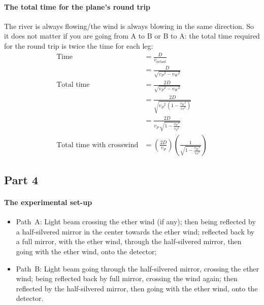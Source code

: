 \documentclass[pagesize,headsepline,10pt,parskip=half]{scrreprt}
\begin{document}
        \paragraph{The total time for the plane’s round trip}
          The river is always flowing/the wind is always blowing
          in the same direction.  So it does not matter if you are
          going from A to B or B to A: the total time required
          for the round trip is twice the time for each leg:
          \begin{align*}
            \text{Time} &= \frac{D}{v_{actual}}\\
            &= \frac{D}{\sqrt{{v_P}^2 - {v_W}^2}}\\
            \text{Total time} &= \frac{2D}{\sqrt{{v_P}^2 - {v_W}^2}}\\
            &= \frac{2D}{\sqrt{{v_P}^2\,\left(1 - \frac{{v_W}^2}{{v_P}^2}\right)}}\\
            &= \frac{2D}{v_P\,\sqrt{1 - \frac{{v_W}^2}{{v_P}^2}}}\\
            \text{Total time with crosswind} &= \left(\frac{2D}{v_P}\right)\left(\frac{1}{\sqrt{1 - \frac{{v_W}^2}{{v_P}^2}}}\right)
          \end{align*}

      \clearpage
      \subsection{Part 4}
        \paragraph{The experimental set-up}
          \begin{itemize}
            \item Path~A: Light beam crossing the ether wind (if any);
              then being reflected by a half-silvered mirror in the center
              towards the ether wind;
              reflected back by a full mirror, with the ether wind,
              through the half-silvered mirror,
              then going with the ether wind, onto the detector;
            \item Path~B: Light beam going through the half-silvered mirror,
              crossing the ether wind; being reflected back by full mirror,
              crossing the wind again;
              then reflected by the half-silvered mirror,
              then going with the ether wind, onto the detector.
          \end{itemize}
\end{document}
